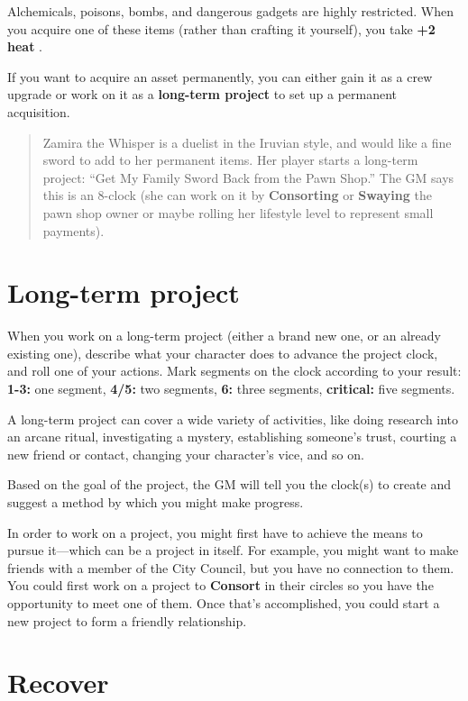 \documentclass[11pt,oneside]{book}
\newcommand{\gameterm}[1]{\textbf{#1}}
\begin{document}
Alchemicals, poisons, bombs, and dangerous gadgets are highly restricted. When you acquire one of these items (rather than crafting it yourself), you take \textbf{+2} \gameterm{heat} .

If you want to acquire an asset permanently, you can either gain it as a crew upgrade or work on it as a \textbf{long-term project} to set up a permanent acquisition.

\begin{quote}
	Zamira the Whisper is a duelist in the Iruvian style, and would like a fine sword to add to her permanent items. Her player starts a long-term project: “Get My Family Sword Back from the Pawn Shop.” The GM says this is an 8-clock (she can work on it by \gameterm{Consorting}  or \gameterm{Swaying}  the pawn shop owner or maybe rolling her lifestyle level to represent small payments).
\end{quote} 

\section{Long-term project}

When you work on a long-term project (either a brand new one, or an already existing one), describe what your character does to advance the project clock, and roll one of your actions. Mark segments on the clock according to your result: \gameterm{1-3:}  one segment, \gameterm{4/5:}  two segments, \gameterm{6:}  three segments, \gameterm{critical:}  five segments.

A long-term project can cover a wide variety of activities, like doing research into an arcane ritual, investigating a mystery, establishing someone’s trust, courting a new friend or contact, changing your character’s vice, and so on.

Based on the goal of the project, the GM will tell you the clock(s) to create and suggest a method by which you might make progress.

In order to work on a project, you might first have to achieve the means to pursue it---which can be a project in itself. For example, you might want to make friends with a member of the City Council, but you have no connection to them. You could first work on a project to \gameterm{Consort}  in their circles so you have the opportunity to meet one of them. Once that’s accomplished, you could start a new project to form a friendly relationship.

\section{Recover}
\end{document}
